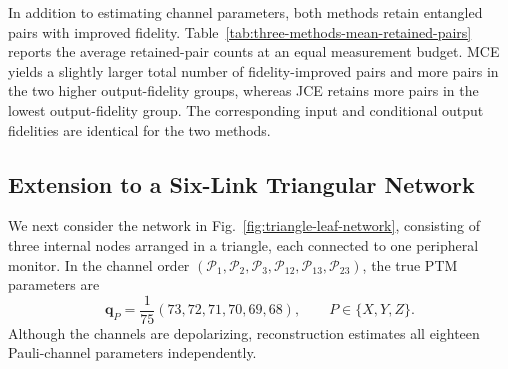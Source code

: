 In addition to estimating channel parameters, both
methods retain entangled pairs with improved fidelity.
Table~\ref{tab:three-methods-mean-retained-pairs} reports
the average retained-pair counts
at an equal measurement budget.
MCE yields a slightly larger total number of
fidelity-improved pairs and more pairs in the two
higher output-fidelity groups, whereas JCE retains
more pairs in the lowest output-fidelity group.
The corresponding input and conditional output
fidelities are identical for the two methods.



\subsection{Extension to a Six-Link Triangular Network}
\label{sub2}
We next consider the network in
Fig.~\ref{fig:triangle-leaf-network}, consisting of three internal
nodes arranged in a triangle, each connected to one
peripheral monitor.
In the channel order
$(\mathcal P_1,\mathcal P_2,\mathcal P_3,
  \mathcal P_{12},\mathcal P_{13},\mathcal P_{23})$,
the true PTM parameters are
\begin{equation}
    \boldsymbol q_P
    =
    \frac{1}{75}(73,72,71,70,69,68),
    \qquad P\in\{X,Y,Z\}.
\end{equation}
Although the channels are depolarizing, reconstruction
estimates all eighteen Pauli-channel parameters independently.
